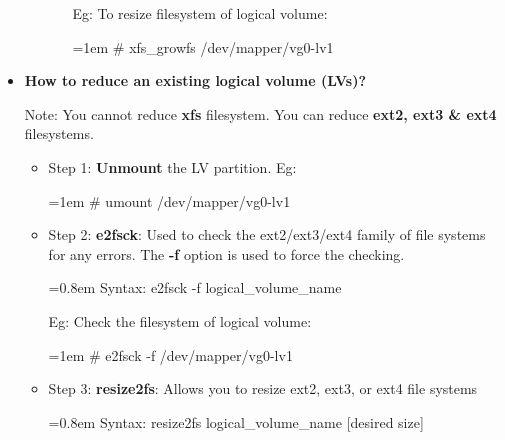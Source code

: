 \begin{flushleft}
\begin{itemize}
\begin{itemize}
\begin{itemize}
			Eg: To resize filesystem of logical volume:
			\begin{tcolorbox}[breakable,notitle,boxrule=-0pt,colback=black,colframe=black]
				\color{green}
				\font=1em
				\# xfs\_growfs /dev/mapper/vg0-lv1
				\font=4pt
			\end{tcolorbox}
			
			\end{itemize}
	\end{itemize}				
	
	\bigskip
	\bigskip
	
	\item  \textbf{How to reduce an existing logical volume (LVs)?}
	
	\begin{tcolorbox}[breakable,notitle,boxrule=-0pt,colback=yellow,colframe=yellow]
		\color{black}
		Note: You cannot reduce \textbf{xfs} filesystem. You can reduce \textbf{ext2, ext3 \& ext4} filesystems.
	\end{tcolorbox}
	
	\begin{itemize}
		\item Step 1: 
		\newline
		\textbf{Unmount} the LV partition. 
		\newline Eg:
		\begin{tcolorbox}[breakable,notitle,boxrule=-0pt,colback=black,colframe=black]
			\color{green}
			\font=1em
			\# umount /dev/mapper/vg0-lv1
			\font=4pt
		\end{tcolorbox}
		\item Step 2:
		\newline
		\textbf{e2fsck}: Used to check the ext2/ext3/ext4 family of file systems for any errors.
		The \textbf{-f} option is used to force the checking.
		\begin{tcolorbox}[breakable,notitle,boxrule=-0pt,colback=pink,colframe=pink]
			\color{black}
			\font=0.8em
			Syntax: e2fsck -f logical\_volume\_name
			\font=4pt
		\end{tcolorbox}
		
		Eg: Check the filesystem of logical volume:
		\begin{tcolorbox}[breakable,notitle,boxrule=-0pt,colback=black,colframe=black]
			\color{green}
			\font=1em
			\# e2fsck -f /dev/mapper/vg0-lv1
			\font=4pt
		\end{tcolorbox}
		
		\item Step 3:
		\newline
		\textbf{resize2fs}: Allows you to resize ext2, ext3, or ext4 file systems 
		\begin{tcolorbox}[breakable,notitle,boxrule=-0pt,colback=pink,colframe=pink]
			\color{black}
			\font=0.8em
			Syntax: resize2fs logical\_volume\_name [desired size]
			\font=4pt
		\end{tcolorbox}
		

\end{itemize}
\end{itemize}
\end{flushleft}
